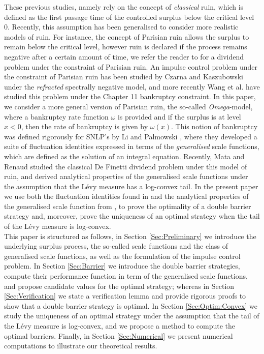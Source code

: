 \documentclass[10pt,a4paper]{amsart}
\begin{document}
These previous studies, namely \cite{JS1995,loeffen2009,Paulsen2007} rely on the concept of \textit{classical} ruin, which is defined as the first passage time of the controlled surplus below  the critical level 0. Recently, this assumption has been generalised to consider more realistic models of ruin. For instance, the concept of Parisian ruin allows the surplus to remain below the critical level, however ruin is declared if the process remains negative after a certain amount of time, we refer the reader to \cite{renaud2019} for a dividend problem under the constraint of Parisian ruin. An impulse control problem under the constraint of Parisian ruin has been studied by Czarna and Kaszubowski \cite{CK2020} under the \textit{refracted} spectrally negative model, and more recently Wang et al. \cite{Wang2024} have studied this problem under the Chapter 11 bankruptcy constraint. In this paper, we consider a more general version of Parisian ruin, the so-called \textit{Omega}-model, where a bankruptcy rate function $\omega$ is provided and if the surplus is at level $x < 0$, then the rate of bankruptcy is given by $\omega(x)$. This notion of bankruptcy was defined rigorously for SNLP's by Li and Palmowski \cite{li-palmowski_2018}, where they developed a suite of fluctuation identities expressed in terms of the \textit{generalised} scale functions, which are defined as the solution of an integral equation. Recently, Mata and Renaud \cite{mata-renaud_2024} studied the classical De Finetti dividend problem under this model of ruin, and derived analytical properties of the generalised scale functions under the assumption that the L\'evy measure has a log-convex tail. In the present paper we use both the fluctuation identities found in \cite{li-zhou_2014} and the analytical properties of the generalised scale function from \cite{mata-renaud_2024}, to prove the optimality of a double barrier strategy and, moreover, prove the uniqueness of an optimal strategy when the tail of the L\'evy measure is log-convex.\\
This paper is structured as follows, in Section \ref{Sec:Preliminary} we introduce the underlying surplus process, the so-called scale functions and the class of generalised scale functions, as well as the formulation of the impulse control problem. In Section \ref{Sec:Barrier} we introduce the double barrier strategies, compute their performance function in term of the generalised scale functions, and propose candidate values for the optimal strategy; whereas in Section \ref{Sec:Verification} we state a verification lemma and provide rigorous proofs to show that a double barrier strategy is optimal. In Section \ref{Sec:Optim:Convex} we study the uniqueness of an optimal strategy under the assumption that the tail of the L\'evy measure is log-convex, and we propose a method to compute the optimal barriers. Finally, in Section \ref{Sec:Numerical} we present numerical computations to illustrate our theoretical results. 
\end{document}
